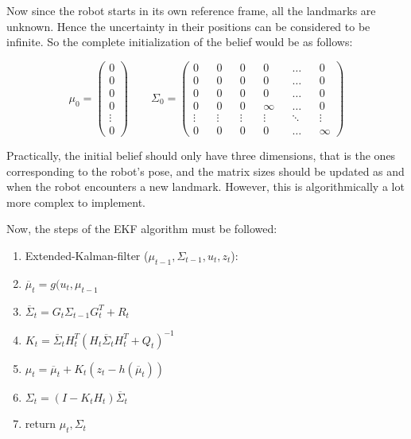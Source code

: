 \documentclass[a4paper]{article}
\begin{document}
Now since the robot starts in its own reference frame, all the landmarks are unknown. Hence the uncertainty in their positions can be considered to be infinite. So the complete initialization of the belief would be as follows:

\begin{equation*}
    \mu_0 = 
    \begin{pmatrix}
        0 \\ 0 \\ 0 \\ 0 \\ \vdots \\ 0
    \end{pmatrix}
    \qquad
    \Sigma_0 = 
    \begin{pmatrix}
        0 && 0 && 0 && 0 && \hdots && 0
        \\
        0 && 0 && 0 && 0 && \hdots && 0
        \\
        0 && 0 && 0 && 0 && \hdots && 0
        \\
        0 && 0 && 0 && \infty && \hdots && 0
        \\
        \vdots && \vdots && \vdots && \vdots && \ddots && \vdots
        \\
        0 && 0 && 0 && 0 && \hdots && \infty
    \end{pmatrix}
\end{equation*}

Practically, the initial belief should only have three dimensions, that is the ones corresponding to the robot's pose, and the matrix sizes should be updated as and when the robot encounters a new landmark. However, this is algorithmically a lot more complex to implement.

Now, the steps of the EKF algorithm must be followed:

\begin{enumerate}
    \item Extended-Kalman-filter ($\mu_{t-1}, \Sigma_{t-1}, u_t, z_t$):
    \item \hspace{2em} $\overline{\mu}_t = g(u_t, \mu_{t-1}$
    \item \hspace{2em} $\overline{\Sigma}_t = G_t \Sigma_{t-1} G_t^T + R_t$
    \item \hspace{2em} $K_t = \overline{\Sigma}_t H_t^T (H_t \overline{\Sigma}_t H_t^T + Q_t) ^{-1}$
    \item \hspace{2em} $\mu_t = \overline{\mu}_t + K_t(z_t - h(\overline{\mu}_t))$
    \item \hspace{2em} $\Sigma_t = (I - K_t H_t) \overline{\Sigma}_t$
    \item \hspace{2em} return $\mu_t, \Sigma_t$
\end{enumerate}
\end{document}
